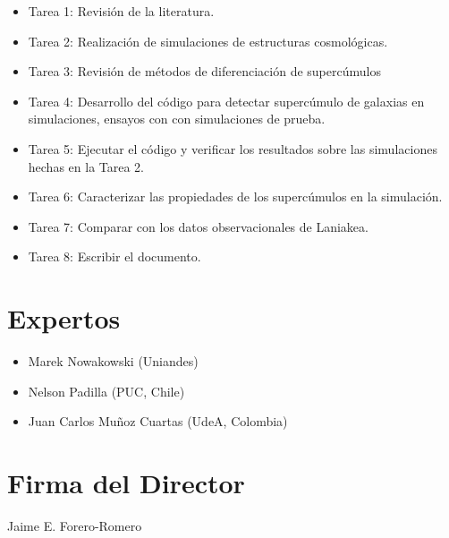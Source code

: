 \documentclass[12pt]{article}
\begin{document}
\begin{itemize}
	\item Tarea 1: Revisi\'{o}n de la literatura. 
	\item Tarea 2: Realizaci\'on de simulaciones de estructuras
          cosmol\'{o}gicas. 
	\item Tarea 3: Revisi\'{o}n de m\'{e}todos de
          diferenciaci\'{o}n de superc\'{u}mulos 
	\item Tarea 4: Desarrollo del c\'{o}digo para detectar 
          superc\'{u}mulo de galaxias en simulaciones, ensayos con 
          con simulaciones de prueba.
	\item Tarea 5: Ejecutar el c\'{o}digo y verificar los
          resultados sobre las simulaciones hechas en la Tarea 2.
	\item Tarea 6: Caracterizar las propiedades de los
          superc\'umulos en la simulaci\'on.
	\item Tarea 7: Comparar con los datos observacionales de
          Laniakea. 
	\item Tarea 8: Escribir el documento.
\end{itemize}

\section{Expertos}

\begin{itemize}
	\item Marek Nowakowski (Uniandes)
	\item Nelson Padilla (PUC, Chile)
	\item Juan Carlos Mu\~noz Cuartas (UdeA, Colombia)
\end{itemize}

%

\renewcommand\refname{Referencias}


\section*{Firma del Director}
\vspace{2.5cm}

Jaime E. Forero-Romero
\end{document}

